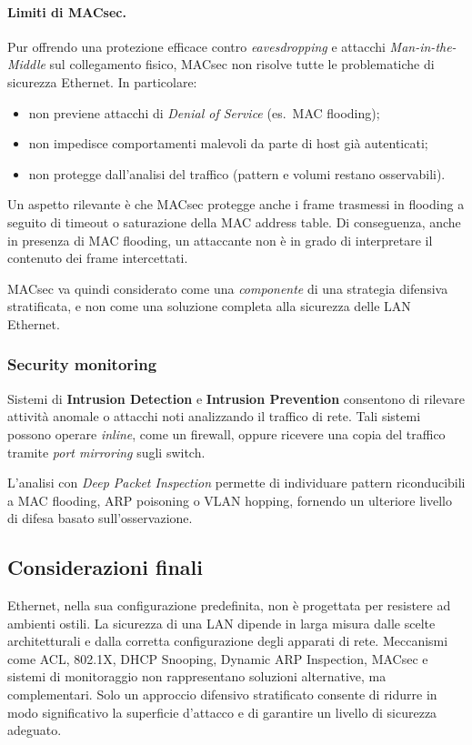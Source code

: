 \paragraph{Limiti di MACsec.}
Pur offrendo una protezione efficace contro \emph{eavesdropping} e attacchi
\emph{Man-in-the-Middle} sul collegamento fisico,
MACsec non risolve tutte le problematiche di sicurezza Ethernet.
In particolare:
\begin{itemize}
  \item non previene attacchi di \emph{Denial of Service} (es.\ MAC flooding);
  \item non impedisce comportamenti malevoli da parte di host già autenticati;
  \item non protegge dall’analisi del traffico (pattern e volumi restano osservabili).
\end{itemize}
Un aspetto rilevante è che MACsec protegge anche i frame trasmessi in flooding
a seguito di timeout o saturazione della MAC address table.
Di conseguenza, anche in presenza di MAC flooding,
un attaccante non è in grado di interpretare il contenuto dei frame intercettati.


MACsec va quindi considerato come una \emph{componente} di una strategia difensiva stratificata,
e non come una soluzione completa alla sicurezza delle LAN Ethernet.


\subsubsection{Security monitoring}

Sistemi di \textbf{Intrusion Detection} e \textbf{Intrusion Prevention} consentono di rilevare
attività anomale o attacchi noti analizzando il traffico di rete.
Tali sistemi possono operare \emph{inline}, come un firewall,
oppure ricevere una copia del traffico tramite \emph{port mirroring} sugli switch.

L’analisi con \emph{Deep Packet Inspection} permette di individuare pattern
riconducibili a MAC flooding, ARP poisoning o VLAN hopping,
fornendo un ulteriore livello di difesa basato sull’osservazione.

\subsection*{Considerazioni finali}

Ethernet, nella sua configurazione predefinita, non è progettata per resistere ad ambienti ostili.
La sicurezza di una LAN dipende in larga misura dalle scelte architetturali
e dalla corretta configurazione degli apparati di rete.
Meccanismi come ACL, 802.1X, DHCP Snooping, Dynamic ARP Inspection, MACsec e sistemi di monitoraggio
non rappresentano soluzioni alternative, ma complementari.
Solo un approccio difensivo stratificato consente di ridurre in modo significativo
la superficie d’attacco e di garantire un livello di sicurezza adeguato.
